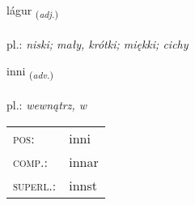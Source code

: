 \documentclass[frontgrid, backgrid]{flacards}\usepackage[]{graphicx}\usepackage[]{xcolor}
\begin{document}
\renewcommand{\blhead}{\vskip5pt {\small\bfseries\footnotesize Lýsingarorð | Adjective }}
\renewcommand{\bcfoot}{\vskip5pt \hspace{2pt}{\small\bfseries\footnotesize 1K}}


{lágur \small{\textsubscript{(\textit{adj.})}} \\[1ex] %
\textphonetic{[lauːɣʏr]} \\
pl.: \emph{niski; mały, krótki; miękki; cichy} \\  [2ex]
\renewcommand*{\arraystretch}{0.8}
}

\renewcommand{\flhead}{\vskip5pt \fboxsep=0pt {\small\bfseries\footnotesize Atviksorð | Adverb}}
\renewcommand{\fcfoot}{\vskip5pt \fboxsep=0pt \hspace{2pt}{\small\bfseries\footnotesize 1K}}

\renewcommand{\blhead}{\vskip5pt {\small\bfseries\footnotesize Atviksorð | Adverb }}
\renewcommand{\bcfoot}{\vskip5pt \hspace{2pt}{\small\bfseries\footnotesize 1K}}


{inni \small{\textsubscript{(\textit{adv.})}} \\[1ex] %
\textphonetic{[ɪnɪ]} \\
pl.: \emph{wewnątrz, w} \\  [2ex]
\renewcommand*{\arraystretch}{0.8}
\begin{tabular}{ll}
\textsc{pos}: & inni \\ 
\textsc{comp.}: & innar \\ 
\textsc{superl.}: & innst \\
\end{tabular}
}
\end{document}
